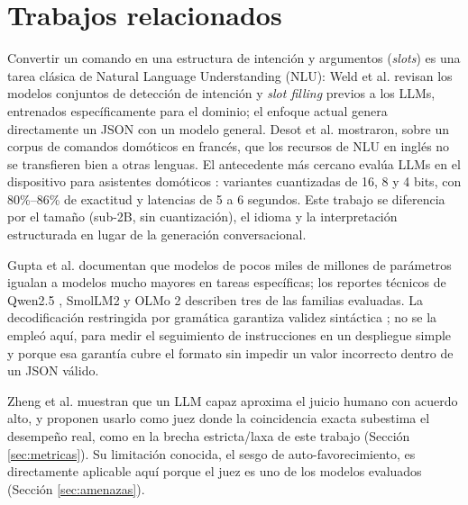 \section{Trabajos relacionados}

Convertir un comando en una estructura de intención y argumentos
(\emph{slots}) es una tarea clásica de Natural Language Understanding (NLU):
Weld et al. \cite{weld2023survey} revisan los modelos conjuntos de detección
de intención y \emph{slot filling} previos a los LLMs, entrenados
específicamente para el dominio; el enfoque actual genera directamente un
JSON con un modelo general.
Desot et al. \cite{desot2018french} mostraron, sobre un corpus de
comandos domóticos en francés, que los recursos de NLU en inglés no se
transfieren bien a otras lenguas. El antecedente más cercano evalúa LLMs en
el dispositivo para asistentes domóticos \cite{ondevice2025homeassistant}:
variantes cuantizadas de 16, 8 y 4 bits, con 80\%--86\% de exactitud y
latencias de 5 a 6 segundos. Este trabajo se diferencia por el tamaño
(sub-2B, sin cuantización), el idioma y la interpretación estructurada en
lugar de la generación conversacional.

Gupta et al. \cite{gupta2025slms} documentan que modelos de pocos miles de
millones de parámetros igualan a modelos mucho mayores en tareas específicas;
los reportes técnicos de Qwen2.5 \cite{qwen2024report}, SmolLM2
\cite{allal2025smollm2} y OLMo 2 \cite{olmo2report} describen tres de las
familias evaluadas. La decodificación restringida por gramática garantiza
validez sintáctica \cite{beurerkellner2024guiding,dong2024xgrammar}; no se la
empleó aquí, para medir el seguimiento de instrucciones en un despliegue
simple y porque esa garantía cubre el formato sin impedir un valor incorrecto
dentro de un JSON válido.

Zheng et al. \cite{zheng2023judging} muestran que un LLM capaz aproxima el
juicio humano con acuerdo alto, y proponen usarlo como juez donde la
coincidencia exacta subestima el desempeño real, como en la brecha
estricta/laxa de este trabajo (Sección \ref{sec:metricas}). Su limitación conocida, el sesgo
de auto-favorecimiento, es directamente aplicable aquí porque el juez es uno
de los modelos evaluados (Sección \ref{sec:amenazas}).
